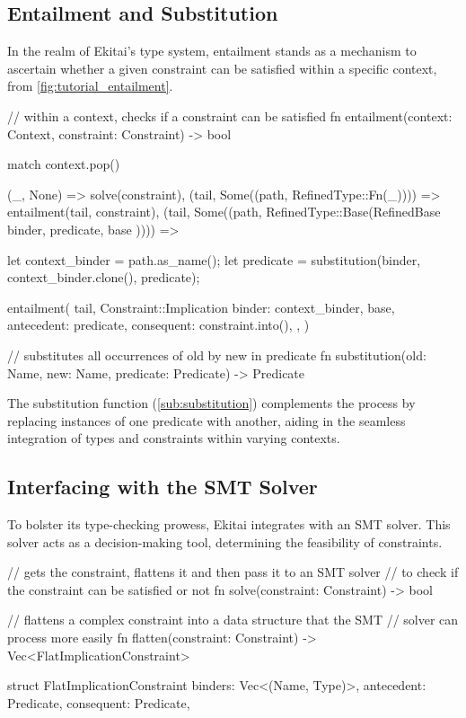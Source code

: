 \documentclass[
  oneside,
  english,
  coorientadorbanca,
  noabntexcite
]{ufsc-thesis-rn46-2019}
\begin{document}
\subsection{Entailment and Substitution}

In the realm of Ekitai's type system, entailment stands as a mechanism to ascertain whether a given constraint can be satisfied within a specific context, from \autoref{fig:tutorial_entailment}.

\begin{rustcode}
// within a context, checks if a constraint can be satisfied
fn entailment(context: Context, constraint: Constraint) -> bool {
  match context.pop() {
    (_, None) => solve(constraint),
    (tail, Some((path, RefinedType::Fn(_)))) => entailment(tail, constraint),
    (tail, Some((path, RefinedType::Base(RefinedBase { binder, predicate, base })))) => {
      let context_binder = path.as_name();
      let predicate = substitution(binder, context_binder.clone(), predicate);

      entailment(
        tail,
        Constraint::Implication {
          binder: context_binder,
          base,
          antecedent: predicate,
          consequent: constraint.into(),
        },
      )
    }
  }
}

// substitutes all occurrences of old by new in predicate
fn substitution(old: Name, new: Name, predicate: Predicate) -> Predicate
\end{rustcode}

The substitution function (\autoref{sub:substitution}) complements the process by replacing instances of one predicate with another, aiding in the seamless integration of types and constraints within varying contexts.

\subsection{Interfacing with the SMT Solver}

To bolster its type-checking prowess, Ekitai integrates with an SMT solver. This solver acts as a decision-making tool, determining the feasibility of constraints.

\begin{rustcode}
// gets the constraint, flattens it and then pass it to an SMT solver
// to check if the constraint can be satisfied or not
fn solve(constraint: Constraint) -> bool

// flattens a complex constraint into a data structure that the SMT
// solver can process more easily
fn flatten(constraint: Constraint) -> Vec<FlatImplicationConstraint>

struct FlatImplicationConstraint {
    binders: Vec<(Name, Type)>,
    antecedent: Predicate,
    consequent: Predicate,
}
\end{rustcode}
\end{document}
